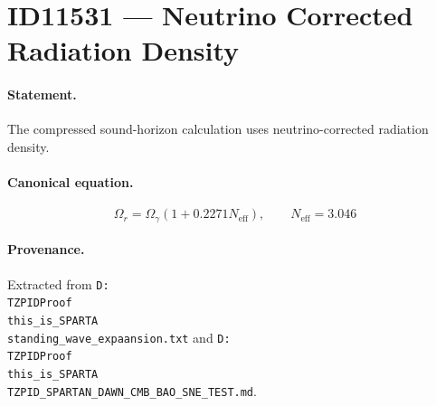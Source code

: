 \section*{ID11531 --- Neutrino Corrected Radiation Density}

\paragraph{Statement.}
The compressed sound-horizon calculation uses neutrino-corrected radiation density.

\paragraph{Canonical equation.}
\[
\Omega_r=\Omega_\gamma(1+0.2271N_{\mathrm{eff}}),\qquad N_{\mathrm{eff}}=3.046
\]

\paragraph{Provenance.}
Extracted from \texttt{D:\\TZPIDProof\\this\_is\_SPARTA\\standing\_wave\_expaansion.txt} and \texttt{D:\\TZPIDProof\\this\_is\_SPARTA\\TZPID\_SPARTAN\_DAWN\_CMB\_BAO\_SNE\_TEST.md}.
